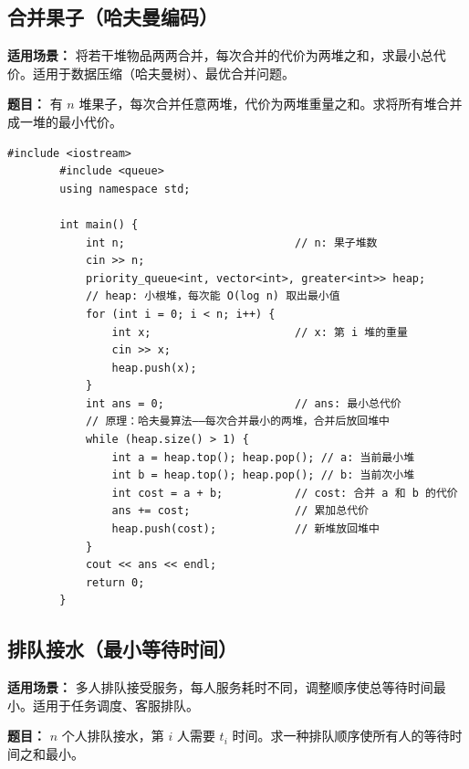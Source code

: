 \documentclass[12pt,a4paper]{ctexart}
\begin{document}
	\subsection{合并果子（哈夫曼编码）}
	\textbf{适用场景：} 将若干堆物品两两合并，每次合并的代价为两堆之和，求最小总代价。适用于数据压缩（哈夫曼树）、最优合并问题。
	
	\textbf{题目：} 有 \(n\) 堆果子，每次合并任意两堆，代价为两堆重量之和。求将所有堆合并成一堆的最小代价。
	
	\begin{lstlisting}[caption={贪心——小根堆每次取最小的两堆合并}]
		#include <iostream>
		#include <queue>
		using namespace std;
		
		int main() {
			int n;                          // n: 果子堆数
			cin >> n;
			priority_queue<int, vector<int>, greater<int>> heap;
			// heap: 小根堆，每次能 O(log n) 取出最小值
			for (int i = 0; i < n; i++) {
				int x;                      // x: 第 i 堆的重量
				cin >> x;
				heap.push(x);
			}
			int ans = 0;                    // ans: 最小总代价
			// 原理：哈夫曼算法——每次合并最小的两堆，合并后放回堆中
			while (heap.size() > 1) {
				int a = heap.top(); heap.pop(); // a: 当前最小堆
				int b = heap.top(); heap.pop(); // b: 当前次小堆
				int cost = a + b;           // cost: 合并 a 和 b 的代价
				ans += cost;                // 累加总代价
				heap.push(cost);            // 新堆放回堆中
			}
			cout << ans << endl;
			return 0;
		}
	\end{lstlisting}
	
	\subsection{排队接水（最小等待时间）}
	\textbf{适用场景：} 多人排队接受服务，每人服务耗时不同，调整顺序使总等待时间最小。适用于任务调度、客服排队。
	
	\textbf{题目：} \(n\) 个人排队接水，第 \(i\) 人需要 \(t_i\) 时间。求一种排队顺序使所有人的等待时间之和最小。
	
\end{document}
